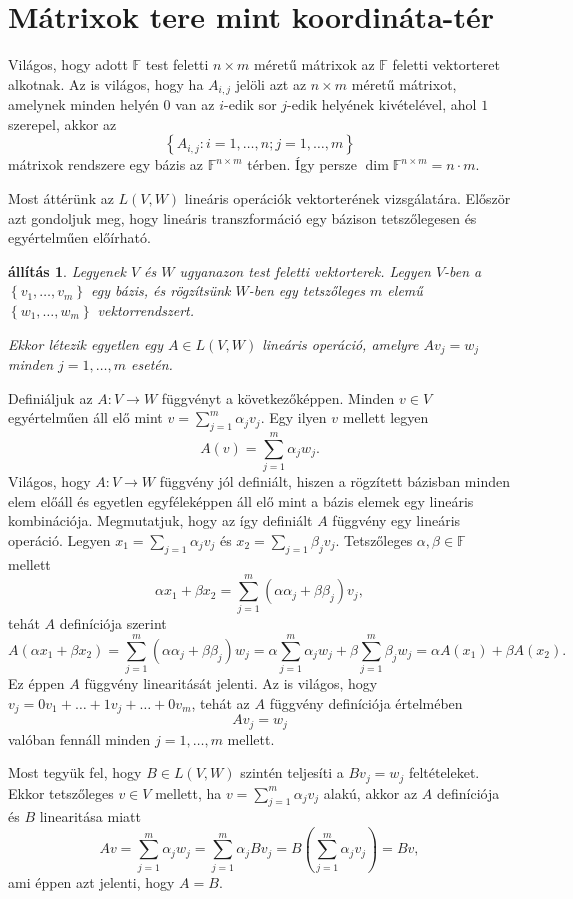 \documentclass[a4paper, showtrims]{memoir}
\makeatletter
\renewenvironment{proof}[1][\proofname]
    {\par\pushQED{\qed}%
    \normalfont \topsep6\p@\@plus6\p@\relax
    \trivlist
    \item[\hskip\labelsep
        \itshape
    #1\@addpunct{:}]\ignorespaces}
    {\popQED\endtrivlist\@endpefalse}
\theoremstyle{plain}
\newtheorem{proposition}{állítás}[chapter]
\theoremstyle{remark}
\theoremstyle{definition}
\makeatother
\begin{document}
\section{Mátrixok tere mint koordináta-tér}
Világos, hogy adott $\mathbb{F}$ test feletti $n\times m$ méretű mátrixok az $\mathbb{F}$ feletti
vektorteret alkotnak.
Az is világos, hogy ha $A_{i,j}$ jelöli azt az $n\times m$ méretű mátrixot,
amelynek minden helyén $0$ van az $i$-edik sor $j$-edik helyének kivételével, ahol $1$ szerepel,
akkor az
\[
	\left\{ A_{i,j}:i=1,\ldots,n;j=1,\ldots,m\right\}
\]
mátrixok rendszere egy bázis az $\mathbb{F}^{n\times m}$ térben.
Így persze $\dim \mathbb{F}^{n\times m} = n\cdot m$.

Most áttérünk az $L\left( V,W \right)$ lineáris operációk vektorterének vizsgálatára.
Először azt gondoljuk meg, hogy lineáris transzformáció egy bázison tetszőlegesen és egyértelműen előírható.
\begin{proposition}\label{pr:bazisonegyertelmu}
	Legyenek $V$ és $W$ ugyanazon test feletti vektorterek.
	Legyen $V$-ben a $\left\{ v_1,\ldots,v_m \right\}$ egy bázis,
	és rögzítsünk $W$-ben egy tetszőleges $m$ elemű $\left\{ w_1,\ldots,w_m \right\}$ vektorrendszert.

	Ekkor létezik egyetlen egy $A\in L\left( V,W \right)$ lineáris operáció,
	amelyre $Av_j=w_j$ minden $j=1,\ldots,m$ esetén.
\end{proposition}
\begin{proof}
	Definiáljuk az $A:V\to W$ függvényt a következőképpen.
	Minden $v\in V$ egyértelműen áll elő mint $v=\sum_{j=1}^m\alpha_jv_j$.
	Egy ilyen $v$ mellett legyen
	\[
		A\left( v \right)=\sum_{j=1}^m\alpha_jw_j.
	\]
	Világos, hogy $A:V\to W$ függvény jól definiált, hiszen a rögzített bázisban minden elem előáll és egyetlen egyféleképpen
	áll elő mint a bázis elemek egy lineáris kombinációja.
	Megmutatjuk, hogy az így definiált $A$ függvény egy lineáris operáció.
	Legyen $x_1=\sum_{j=1}\alpha_jv_j$ és
	$x_2=\sum_{j=1}\beta_jv_j$.
	Tetszőleges $\alpha,\beta\in\mathbb{F}$ mellett
	\[
		\alpha x_1+\beta x_2=
		\sum_{j=1}^m\left( \alpha\alpha_j+\beta\beta_j \right)v_j,
	\]
	tehát $A$ definíciója szerint
	\[
		A\left( \alpha x_1+\beta x_2 \right)=
		\sum_{j=1}^m\left( \alpha\alpha_j+\beta\beta_j \right)w_j
		=
		\alpha\sum_{j=1}^m\alpha_jw_j+
		\beta\sum_{j=1}^m\beta_jw_j=
		\alpha A\left( x_1 \right)+\beta A\left( x_2 \right).
	\]
	Ez éppen $A$ függvény linearitását jelenti.
	Az is világos, hogy $v_j=0v_1+\ldots+1v_j+\ldots +0v_m$, tehát az $A$ függvény definíciója értelmében
	\[
		Av_j=w_j
	\] valóban fennáll minden $j=1,\ldots,m$ mellett.

	Most tegyük fel, hogy $B\in L\left( V,W \right)$ szintén teljesíti a $Bv_j=w_j$ feltételeket.
	Ekkor tetszőleges $v\in V$ mellett, ha $v=\sum_{j=1}^m\alpha_jv_j$ alakú,
	akkor az $A$ definíciója és $B$ linearitása miatt
	\[
		Av=\sum_{j=1}^m\alpha_jw_j=
		\sum_{j=1}^m\alpha_jBv_j=
		B\left( \sum_{j=1}^m\alpha_jv_j \right)=Bv,
	\]
	ami éppen azt jelenti, hogy $A=B$.
\end{proof}
\end{document}
